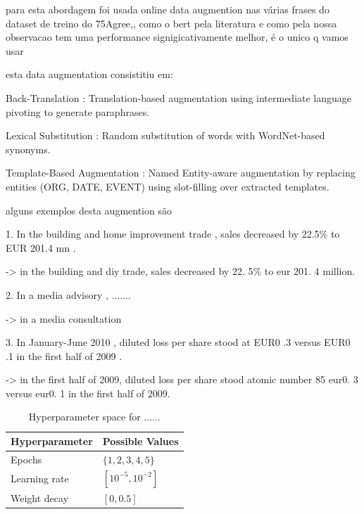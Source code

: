 \documentclass[conference]{IEEEtran}
\begin{document}
para esta abordagem foi usada online data augmention nas várias frases do dataset de treino do 75Agree,, como o bert pela literatura e como pela nossa observacao tem uma performance signigicativamente melhor, é o unico q vamos usar

esta data augmentation consistitiu em:

Back-Translation : Translation-based augmentation using intermediate language pivoting to generate paraphrases.


Lexical Substitution : Random substitution of words with WordNet-based synonyms.


Template-Based Augmentation : Named Entity-aware augmentation by replacing entities (ORG, DATE, EVENT) using slot-filling over extracted templates.


alguns exemplos desta augmention são

1. In the building and home improvement trade , sales decreased by 22.5\% to EUR 201.4 mn .

-> in the building and diy trade, sales decreased by 22. 5\% to eur 201. 4 million.

2. In a media advisory , .......

-> in a media consultation

3. In January-June 2010 , diluted loss per share stood at EUR0 .3 versus EUR0 .1 in the first half of 2009 .

-> in the first half of 2009, diluted loss per share stood atomic number 85 eur0. 3 versus eur0. 1 in the first half of 2009.




\begin{table}[H]
\centering
\caption{Hyperparameter space for ......}
\label{parameters_basebert}
\begin{tabular}{ll}
\toprule
\textbf{Hyperparameter} & \textbf{Possible Values} \\
\midrule
Epochs & $\{1,2,3,4,5\}$ \\
Learning rate & $[10^{-5}, 10^{-2}]$ \\
Weight decay & $[0, 0.5]$ \\
\bottomrule
\end{tabular}
\end{table}
\end{document}
